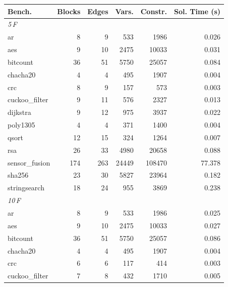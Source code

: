 \begin{tabular}{lrrrrr}
\toprule
Bench. & Blocks & Edges & Vars. & Constr. & Sol. Time (s) \\
\midrule
\multicolumn{1}{l}{\textit{5\,\textmu{}F}} \\
ar             & \num{8} & \num{9} & \num{533} & \num{1986} & \num{0.026} \\
aes            & \num{9} & \num{10} & \num{2475} & \num{10033} & \num{0.031} \\
bitcount       & \num{36} & \num{51} & \num{5750} & \num{25057} & \num{0.084} \\
chacha20       & \num{4} & \num{4} & \num{495} & \num{1907} & \num{0.004} \\
crc            & \num{8} & \num{9} & \num{157} & \num{573} & \num{0.003} \\
cuckoo\_filter & \num{9} & \num{11} & \num{576} & \num{2327} & \num{0.013} \\
dijkstra       & \num{9} & \num{12} & \num{975} & \num{3937} & \num{0.022} \\
poly1305       & \num{4} & \num{4} & \num{371} & \num{1400} & \num{0.004} \\
qsort          & \num{12} & \num{15} & \num{324} & \num{1264} & \num{0.007} \\
rsa            & \num{26} & \num{33} & \num{4980} & \num{20658} & \num{0.088} \\
sensor\_fusion & \num{174} & \num{263} & \num{24449} & \num{108470} & \num{77.378} \\
sha256         & \num{23} & \num{30} & \num{5827} & \num{23964} & \num{0.182} \\
stringsearch   & \num{18} & \num{24} & \num{955} & \num{3869} & \num{0.238} \\
\midrule
\multicolumn{1}{l}{\textit{10\,\textmu{}F}} \\
ar             & \num{8} & \num{9} & \num{533} & \num{1986} & \num{0.025} \\
aes            & \num{9} & \num{10} & \num{2475} & \num{10033} & \num{0.027} \\
bitcount       & \num{36} & \num{51} & \num{5750} & \num{25057} & \num{0.086} \\
chacha20       & \num{4} & \num{4} & \num{495} & \num{1907} & \num{0.004} \\
crc            & \num{6} & \num{6} & \num{117} & \num{414} & \num{0.003} \\
cuckoo\_filter & \num{7} & \num{8} & \num{432} & \num{1710} & \num{0.005} \\

\end{tabular}
